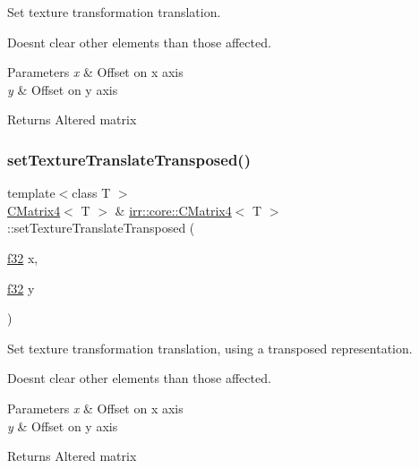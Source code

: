 Set texture transformation translation. 

Doesn\textquotesingle{}t clear other elements than those affected. 
\begin{DoxyParams}{Parameters}
{\em x} & Offset on x axis \\
\hline
{\em y} & Offset on y axis \\
\hline
\end{DoxyParams}
\begin{DoxyReturn}{Returns}
Altered matrix 
\end{DoxyReturn}
\mbox{\label{classirr_1_1core_1_1CMatrix4_a7d999210cc7427e9d744271e50d26c3c}} 
\subsubsection{\texorpdfstring{set\+Texture\+Translate\+Transposed()}{setTextureTranslateTransposed()}\hspace{0.1cm}{\footnotesize\ttfamily [1/2]}}
{\footnotesize\ttfamily template$<$class T $>$ \\
\hyperlink{classirr_1_1core_1_1CMatrix4}{C\+Matrix4}$<$ T $>$ \& \hyperlink{classirr_1_1core_1_1CMatrix4}{irr\+::core\+::\+C\+Matrix4}$<$ T $>$\+::set\+Texture\+Translate\+Transposed (\begin{DoxyParamCaption}\item[{\hyperlink{namespaceirr_a0277be98d67dc26ff93b1a6a1d086b07}{f32}}]{x,  }\item[{\hyperlink{namespaceirr_a0277be98d67dc26ff93b1a6a1d086b07}{f32}}]{y }\end{DoxyParamCaption})\hspace{0.3cm}{\ttfamily [inline]}}



Set texture transformation translation, using a transposed representation. 

Doesn\textquotesingle{}t clear other elements than those affected. 
\begin{DoxyParams}{Parameters}
{\em x} & Offset on x axis \\
\hline
{\em y} & Offset on y axis \\
\hline
\end{DoxyParams}
\begin{DoxyReturn}{Returns}
Altered matrix 
\end{DoxyReturn}
\mbox{\label{classirr_1_1core_1_1CMatrix4_a3c37720b52df398bf0bbe50ff56870eb}} 
